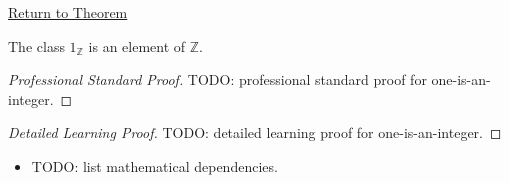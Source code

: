 \newpage
{}
\label{prf:one-is-an-integer}

\begin{remark*}[Return]
\hyperref[thm:one-is-an-integer]{Return to Theorem}
\end{remark*}

\begin{theorem*}
The class $1_{\mathbb{Z}}$ is an element of $\mathbb{Z}$.
\end{theorem*}

\begin{proof}[Professional Standard Proof]
\LRAProofBodyStart
TODO: professional standard proof for one-is-an-integer.
\end{proof}

\begin{proof}[Detailed Learning Proof]
\LRAProofBodyStart
TODO: detailed learning proof for one-is-an-integer.
\end{proof}

\begin{remark*}
\end{remark*}

\begin{dependencies}
\begin{itemize}
  \item TODO: list mathematical dependencies.
\end{itemize}
\end{dependencies}

\clearpage
